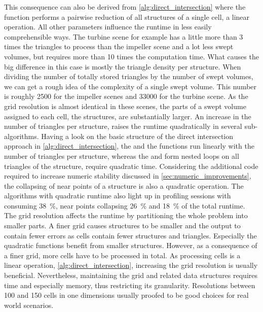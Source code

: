 This consequence can also be derived from \cref{alg:direct_intersection} where the  function performs a pairwise reduction of all structures of a single cell, a linear operation.
All other parameters influence the runtime in less easily comprehensible ways.
The turbine scene for example has a little more than 3 times the triangles to process than the impeller scene and a lot less swept volumes, but requires more than 10 times the computation time.
What causes the big difference in this case is mostly the triangle density per structure.
When dividing the number of totally stored triangles by the number of swept volumes, we can get a rough idea of the complexity of a single swept volume.
This number is roughly 2500 for the impeller scenes and 33000 for the turbine scene.
As the grid resolution is almost identical in these scenes, the parts of a swept volume assigned to each cell, \ie the structures, are substantially larger.
An increase in the number of triangles per structure, raises the runtime quadratically in several sub-algorithms.
Having a look on the basic structure of the direct intersection approach in \cref{alg:direct_intersection}, the  and the  functions run linearly with the number of triangles per structure, whereas the  and  form nested loops on all triangles of the structure, \ie require quadratic time.
Considering the additional code required to increase numeric stability discussed in \cref{sec:numeric_improvements}, the collapsing of near points of a structure is also a quadratic operation.
The algorithms with quadratic runtime also light up in profiling sessions with  consuming \SI{38}{\percent}, near points collapsing \SI{26}{\percent} and  \SI{18}{\percent} of the total runtime.
The grid resolution affects the runtime by partitioning the whole problem into smaller parts.
A finer grid causes structures to be smaller and the output to contain fewer errors as cells contain fewer structures and triangles.
Especially the quadratic functions benefit from smaller structures.
However, as a consequence of a finer grid, more cells have to be processed in total.
As processing cells is a linear operation, \cf \cref{alg:direct_intersection}, increasing the grid resolution is usually beneficial.
Nevertheless, maintaining the grid and related data structures requires time and especially memory, thus restricting its granularity.
Resolutions between 100 and 150 cells in one dimensions usually proofed to be good choices for real world scenarios.

